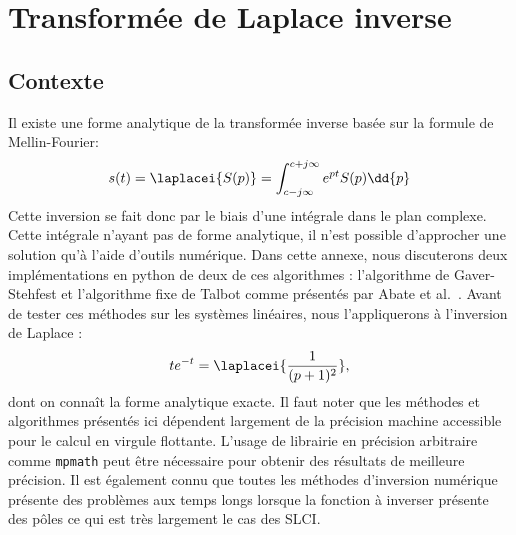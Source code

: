 \chapter{Transformée de Laplace inverse~\label{annexe-invL}}
\section{Contexte}
Il existe une forme analytique de la transformée inverse basée sur
la formule de Mellin-Fourier\cite{Ostertag}:
\[
s(t)=\laplacei{S(p)}=\int_{c-j\infty}^{c+j\infty} e^{pt}S(p)\dd{p}
\]
Cette inversion se fait donc par le biais d'une intégrale dans le plan
complexe. Cette intégrale n'ayant pas de forme analytique, il n'est possible 
d'approcher une solution qu'à l'aide d'outils numérique. 
Dans cette annexe, nous discuterons deux implémentations en python de 
deux de ces algorithmes : 
l'algorithme de Gaver-Stehfest et l'algorithme fixe de Talbot comme présentés
par Abate et al.~\cite{abate2004,abate2006,frwiki:200676411}.
Avant de tester ces méthodes sur les systèmes linéaires, nous l'appliquerons
à l'inversion de Laplace :  
\[
    te^{-t}=\laplacei{\dfrac{1}{(p+1)^2}},
\]
dont on connaît la forme analytique exacte.
Il faut noter que les méthodes et algorithmes présentés ici dépendent 
largement de la précision machine accessible pour le calcul 
en virgule flottante. L'usage de librairie en précision arbitraire 
comme \texttt{mpmath} peut être 
nécessaire pour obtenir des résultats de meilleure précision. Il est également
connu que toutes les méthodes d'inversion numérique présente des problèmes
aux temps longs lorsque la fonction à inverser présente des pôles ce qui 
est très largement le cas des SLCI.
